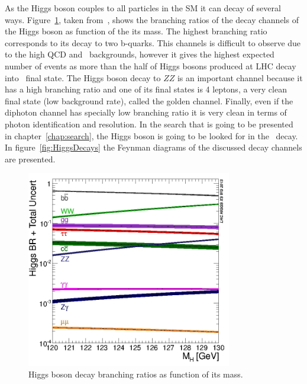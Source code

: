 As the Higgs boson couples to all particles in the SM it can decay of several ways. Figure~\ref{fig:HiggsBrs}, taken from~\cite{Dittmaier:2011ti, Dittmaier:2012vm, Heinemeyer:2013tqa, HIGGSXSWG}, shows the branching ratios of the decay channels of the Higgs boson as function of the its mass. The highest branching ratio corresponds to its decay to two b-quarks. This channels is difficult to observe due to the high QCD and \ttbar~backgrounds, however it gives the highest expected number of events as more than the half of Higgs bosons produced at LHC decay into \bbbar~final state. The Higgs boson decay to $ZZ$ is an important channel because it has a high branching ratio and one of its final states is 4 leptons, a very clean final state (low background rate), called the golden channel. Finally, even if the diphoton channel has specially low branching ratio it is very clean in terms of photon identification and resolution. In the search that is going to be presented in chapter~\ref{chap:search}, the Higgs boson is going to be looked for in the \bbbar~decay. In figure~\ref{fig:HiggsDecays} the Feynman diagrams of the discussed decay channels are presented.

\begin{figure}[!Hhtbp]
  \begin{center}
    \includegraphics[width=0.8\textwidth]{figs/Higgs_BR_120-130.jpg}
    \caption{Higgs boson decay branching ratios as function of its mass.}
    \label{fig:HiggsBrs}
  \end{center}
\end{figure}

